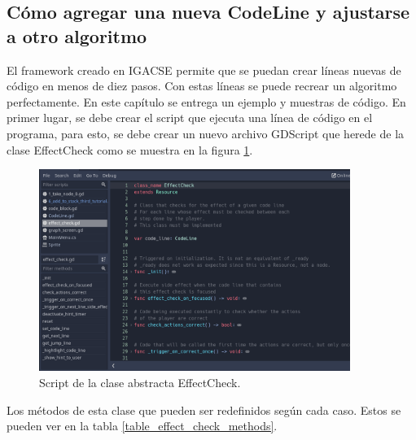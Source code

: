 \subsection{Cómo agregar una nueva CodeLine y ajustarse a otro algoritmo}

El framework creado en IGACSE permite que se puedan crear líneas nuevas de código en menos de diez pasos. Con estas líneas se puede recrear un algoritmo perfectamente. En este capítulo se entrega un ejemplo y muestras de código. En primer lugar, se debe crear el script que ejecuta una línea de código en el programa, para esto, se debe crear un nuevo archivo GDScript que herede de la clase EffectCheck como se muestra en la figura \ref{effect_check_script}.

\begin{figure}[h!]
	\centering
	\includegraphics[width=0.9\textwidth]{imagenes/effect_check_script.png}
	\caption{Script de la clase abstracta EffectCheck.}
	\label{effect_check_script}
\end{figure}


Los métodos de esta clase que pueden ser redefinidos según cada caso. Estos se pueden ver en la tabla \ref{table_effect_check_methods}. 


